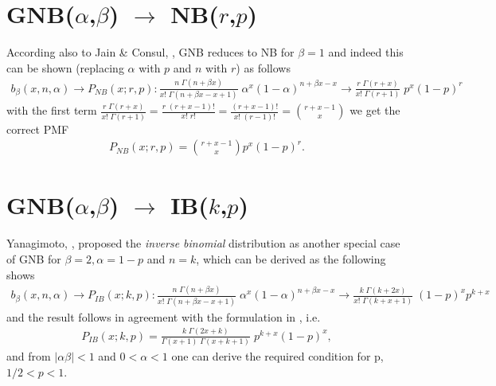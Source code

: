 \section{GNB($\alpha$,$\beta$) $\rightarrow$ NB($r$,$p$)}
According also to Jain \& Consul, \cite{jain1971generalized}, GNB reduces to NB for $\beta = 1$ and 
indeed this can be shown (replacing $\alpha$ with $p$ and $n$ with $r$) as follows
\begin{align*}
 b_{\beta}(x,n,\alpha) \rightarrow P_{N\!B}(x;r,p):
 \frac{n \; \Gamma(n+\beta x)}{x! \;\Gamma(n + \beta x - x +1)}  \; \alpha^x (1-\alpha)^{n+\beta x-x} \rightarrow 
\frac{r \; \Gamma(r + x)}{x! \;\Gamma(r + 1)}  \; p^x (1-p)^{r} 
\end{align*}
with the first term $\frac{r \; \Gamma(r + x)}{x! \;\Gamma(r + 1)} = \frac{r \; (r + x - 1)!}{x! \;r!} = \frac{(r + x - 1)!}{x! \;(r-1)!}
= {r + x - 1 \choose x}$ we get the correct PMF
\begin{align*}
P_{N\!B}(x;r,p) = {r + x - 1 \choose x} p^x (1-p)^r  .
\end{align*}


\section{GNB($\alpha$,$\beta$) $\rightarrow$ IB($k$,$p$)}
Yanagimoto, \cite{yanagimoto1989inverse}, proposed the \emph{inverse binomial} 
distribution as another special case of GNB for $\beta = 2, \alpha=1-p$ and $n=k$, which 
can be derived as the following shows 
\begin{align*}
b_{\beta}(x,n,\alpha) \rightarrow P_{I\!B}(x;k,p):
 \frac{n \; \Gamma(n+\beta x)}{x! \;\Gamma(n + \beta x - x +1)}  \; \alpha^x (1-\alpha)^{n+\beta x-x} \rightarrow 
\frac{k \; \Gamma(k + 2x)}{x! \;\Gamma(k + x + 1)}  \; (1-p)^x p^{k+x} 
\end{align*}
and the result follows in agreement with the formulation in \cite{yanagimoto1989inverse}, i.e.
\begin{align*}
P_{I\!B}(x;k,p) = \frac{k \; \Gamma(2x + k)}{\Gamma(x+1) \;\Gamma(x + k + 1)}  \; p^{k+x} (1-p)^x ,
\end{align*}
and from $|\alpha \beta| < 1$ and $0<\alpha<1$ one can derive the required condition for p, $1/2 < p < 1$.

